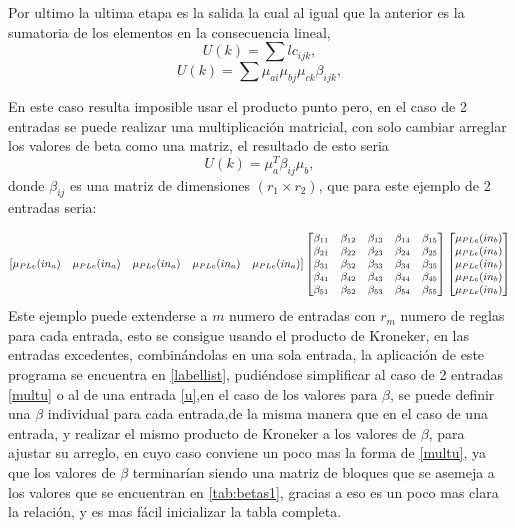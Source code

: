     Por ultimo la ultima etapa es la salida la cual al igual que la anterior es la sumatoria de los elementos en la consecuencia lineal, \begin{equation}    U(k)= \sum lc_{ijk} ,
    \end{equation}
    \begin{equation}
    U(k)= \sum  \mu_{ai} \mu_{bj} \mu_{ck} \beta_{ijk}  ,
    \end{equation}
    
     En este caso resulta imposible usar el producto punto pero, en el caso de 2 entradas se puede realizar una multiplicación matricial, con solo cambiar arreglar los valores de beta como una matriz, el resultado de esto seria \begin{equation}
     \label{multu}
     U(k)= \mu_{a}^{T} \beta_{ij} \mu_{b} ,
     \end{equation}  donde $\beta_{ij}$ es una matriz de dimensiones $(r_1 \times r_2)$, que para este ejemplo de 2 entradas seria:
     
    \begin{equation}
     \small{
    \begin{bmatrix}
    \mu_{PLe}(in_a) & \mu_{PLe}(in_a) & \mu_{PLe}(in_a) & \mu_{PLe}(in_a) & \mu_{PLe}(in_a)
    \end{bmatrix} } \begin{bmatrix}
   \beta_{11} &\beta_{12}  &\beta_{13}  &\beta_{14}  &\beta_{15}  \\ 
   \beta_{21} & \beta_{22} & \beta_{23} & \beta_{24} & \beta_{25} \\ 
   \beta_{31} &\beta_{32}  &\beta_{33}  &\beta_{34}  &\beta_{35}\\
   \beta_{41} &\beta_{42}  &\beta_{43}  &\beta_{44}  &\beta_{45}\\
   \beta_{51} &\beta_{52}  &\beta_{53}  &\beta_{54}  &\beta_{55}    \end{bmatrix}    \begin{bmatrix}
   \mu_{PLe}(in_b) \\ 
    \mu_{PLe}(in_b)\\ 
    \mu_{PLe}(in_b)\\ 
    \mu_{PLe}(in_b)\\ 
    \mu_{PLe}(in_b)
    \end{bmatrix}
    \end{equation}
    Este ejemplo puede extenderse a $m$ numero de entradas con $r_m$ numero de reglas para cada entrada, esto se consigue usando el producto de Kroneker,  en las entradas excedentes, combinándolas en una sola entrada, la aplicación de este programa se encuentra en \cref{labellist}, pudiéndose simplificar al caso de 2 entradas \ref{multu} o al de una entrada \ref{u},en el caso de los valores para $\beta$, se puede definir una $\beta$ individual para cada entrada,de la misma manera que en el caso de una entrada, y realizar el mismo producto de Kroneker a los valores de $\beta$, para ajustar su arreglo, en cuyo caso conviene un poco mas la forma de \cref{multu}, ya que los valores de $\beta$ terminarían siendo una matriz de bloques que se asemeja a los valores que se encuentran en \cref{tab:betas1}, gracias a eso es un poco mas clara la relación, y es mas fácil inicializar la tabla completa.
    
